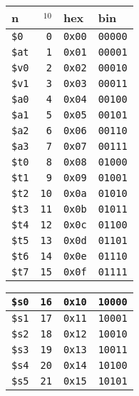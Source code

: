\documentclass[12pt]{article}
\begin{document}
\begin{multicols*}{2}
\begin{flushleft}
\begin{outline}[longenum]
  \\
  \begin{tabular}{|l r l l|}\hline
  n & $_{10}$ & hex & bin   \\\hline
  \verb|$0 | & \verb| 0| & \verb|0x00| & \verb|00000| \\ \hline
  \verb|$at| & \verb| 1| & \verb|0x01| & \verb|00001| \\ \hline \hline
  \verb|$v0| & \verb| 2| & \verb|0x02| & \verb|00010| \\ \hline
  \verb|$v1| & \verb| 3| & \verb|0x03| & \verb|00011| \\ \hline \hline
  \verb|$a0| & \verb| 4| & \verb|0x04| & \verb|00100| \\ \hline
  \verb|$a1| & \verb| 5| & \verb|0x05| & \verb|00101| \\ \hline
  \verb|$a2| & \verb| 6| & \verb|0x06| & \verb|00110| \\ \hline
  \verb|$a3| & \verb| 7| & \verb|0x07| & \verb|00111| \\ \hline \hline
  \verb|$t0| & \verb| 8| & \verb|0x08| & \verb|01000| \\ \hline
  \verb|$t1| & \verb| 9| & \verb|0x09| & \verb|01001| \\ \hline
  \verb|$t2| & \verb|10| & \verb|0x0a| & \verb|01010| \\ \hline
  \verb|$t3| & \verb|11| & \verb|0x0b| & \verb|01011| \\ \hline
  \verb|$t4| & \verb|12| & \verb|0x0c| & \verb|01100| \\ \hline
  \verb|$t5| & \verb|13| & \verb|0x0d| & \verb|01101| \\ \hline
  \verb|$t6| & \verb|14| & \verb|0x0e| & \verb|01110| \\ \hline
  \verb|$t7| & \verb|15| & \verb|0x0f| & \verb|01111| \\ \hline
  \end{tabular}
  \begin{tabular}{|l r l l|}\hline
  \verb|$s0| & \verb|16| & \verb|0x10| & \verb|10000| \\ \hline
  \verb|$s1| & \verb|17| & \verb|0x11| & \verb|10001| \\ \hline
  \verb|$s2| & \verb|18| & \verb|0x12| & \verb|10010| \\ \hline
  \verb|$s3| & \verb|19| & \verb|0x13| & \verb|10011| \\ \hline
  \verb|$s4| & \verb|20| & \verb|0x14| & \verb|10100| \\ \hline
  \verb|$s5| & \verb|21| & \verb|0x15| & \verb|10101| \\ \hline

\end{tabular}
\end{outline}
\end{flushleft}
\end{multicols*}
\end{document}
